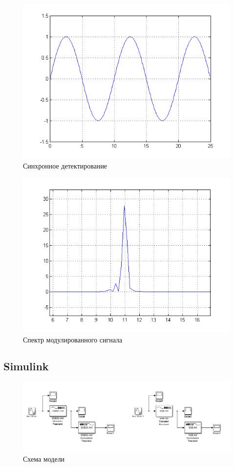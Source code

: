 \begin{figure}[H]
   \includegraphics[scale=0.7]{lab7/ssbdemod.png}
   \caption{Синхронное детектирование}
\end{figure}

\begin{figure}[H]
   \includegraphics[scale=0.7]{lab7/ssbdemod_spectro.png}
   \caption{Спектр модулированного сигнала}
\end{figure}


\subsection{Simulink}

\begin{figure}[H]
   \includegraphics[scale=0.5]{lab7/sim_lab7.png}
   \caption{Схема модели}
\end{figure}

